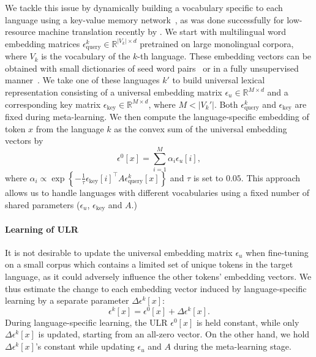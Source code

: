 We tackle this issue by dynamically building a vocabulary specific to each language using a key-value memory network~\citep{miller2016key,gulcehre2018dynamic}, as was done successfully for low-resource machine translation recently by \citet{gu2018universal}. We start with multilingual word embedding matrices $\epsilon^k_{\text{query}} \in \mathbb{R}^{|V_k| \times d}$ pretrained on large monolingual corpora, where $V_k$ is the vocabulary of the $k$-th language. These embedding vectors can be obtained with small dictionaries of seed word pairs~\citep{artetxe2017learning,smith2017offline} or in a fully unsupervised manner~\citep{zhang2017earth,alexis2018word}. We take one of these languages $k'$ to build universal lexical representation consisting of a universal embedding matrix $\epsilon_u \in \mathbb{R}^{M \times d}$ and a corresponding
key matrix $\epsilon_{\text{key}} \in \mathbb{R}^{M \times d}$, where $M < |V_k'|$. Both $\epsilon^k_{\text{query}}$ and $\epsilon_{\text{key}}$ are fixed during meta-learning. We then compute the language-specific embedding of token $x$ from the language $k$ as the convex sum of the universal embedding vectors by
\[
\epsilon^0[x] = \sum_{i=1}^M \alpha_i \epsilon_u[i],
\]
where 
$\alpha_i \propto \exp\left\{ -\tfrac{1}{\tau} \epsilon_{\text{key}}[i]^\top A \epsilon^k_{\text{query}} [x] \right\}$ and $\tau$ is set to $0.05$. This approach allows us to handle languages with different vocabularies using a fixed number of shared parameters ($\epsilon_u$, $\epsilon_{\text{key}}$ and $A$.) 

\paragraph{Learning of ULR}

It is not desirable to update the universal embedding matrix $\epsilon_u$ when fine-tuning on a small corpus which contains a limited set of unique tokens in the target language, as it could adversely influence the other tokens' embedding vectors. We thus estimate the change to each embedding vector induced by language-specific learning by a separate parameter $\Delta \epsilon^k[x]$:
\[
\epsilon^k[x] = \epsilon^0[x] + \Delta \epsilon^k[x].
\]
During language-specific learning, the ULR $\epsilon^0[x]$ is held constant, while only $\Delta \epsilon^k[x]$ is updated, starting from an all-zero vector. On the other hand, we hold $\Delta \epsilon^k[x]$'s constant while updating $\epsilon_u$ and $A$ during the meta-learning stage. 


